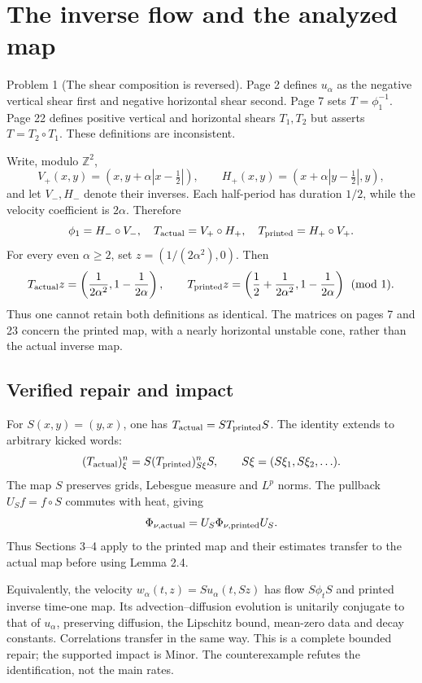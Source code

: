 \documentclass[10pt]{article}
\begin{document}
\section*{The inverse flow and the analyzed map}
Problem 1 (The shear composition is reversed).  Page 2 defines \(u_\alpha\) as the negative vertical shear first and negative horizontal shear second. Page 7 sets \(T=\phi_1^{-1}\). Page 22 defines positive vertical and horizontal shears \(T_1,T_2\) but asserts \(T=T_2\circ T_1\). These definitions are inconsistent.\par
Write, modulo \(\mathbb Z^2\), \[V_+(x,y)=(x,y+\alpha|x-\tfrac12|),\qquad
 H_+(x,y)=(x+\alpha|y-\tfrac12|,y),\] and let \(V_-,H_-\) denote their inverses. Each half-period has duration \(1/2\), while the velocity coefficient is \(2\alpha\). Therefore \[\phi_1=H_-\circ V_-,\quad
 T_{\rm actual}=V_+\circ H_+,\quad T_{\rm printed}=H_+\circ V_+.\] For every even \(\alpha\ge2\), set \(z=(1/(2\alpha^2),0)\). Then \[T_{\rm actual}z=\left(\frac1{2\alpha^2},1-\frac1{2\alpha}\right),
 \qquad
 T_{\rm printed}z=\left(\frac12+\frac1{2\alpha^2},1-\frac1{2\alpha}\right)
 \pmod1.\] Thus one cannot retain both definitions as identical. The matrices on pages 7 and 23 concern the printed map, with a nearly horizontal unstable cone, rather than the actual inverse map.\par
\subsection*{Verified repair and impact}
For \(S(x,y)=(y,x)\), one has \(T_{\rm actual}=S T_{\rm printed}S\). The identity extends to arbitrary kicked words: \[(T_{\rm actual})_\xi^n=S(T_{\rm printed})_{S\xi}^nS,
 \qquad S\xi=(S\xi_1,S\xi_2,\ldots).\] The map \(S\) preserves grids, Lebesgue measure and \(L^p\) norms. The pullback \(U_Sf=f\circ S\) commutes with heat, giving \[\Phi_{\nu,{\rm actual}}=U_S\Phi_{\nu,{\rm printed}}U_S.\] Thus Sections 3–4 apply to the printed map and their estimates transfer to the actual map before using Lemma 2.4.\par
Equivalently, the velocity \(w_\alpha(t,z)=S u_\alpha(t,Sz)\) has flow \(S\phi_tS\) and printed inverse time-one map. Its advection–diffusion evolution is unitarily conjugate to that of \(u_\alpha\), preserving diffusion, the Lipschitz bound, mean-zero data and decay constants. Correlations transfer in the same way. This is a complete bounded repair; the supported impact is Minor. The counterexample refutes the identification, not the main rates.\par
\end{document}
